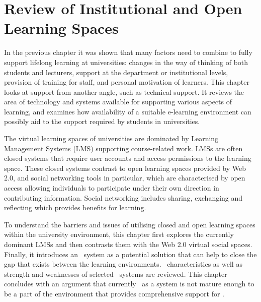 \chapter{Review of Institutional and Open Learning Spaces \label{cha:systudy}}

In the previous chapter it was shown that many factors need to combine to fully
support lifelong learning at universities: changes in the way of thinking of
both students and lecturers, support at the department or institutional levels,
provision of training for staff, and personal motivation of learners. This
chapter looks at \LLLs support from another angle, such as technical support. It
reviews the area of technology and systems available for supporting various
aspects of learning, and examines how availability of a suitable e-learning
environment can possibly aid to the \LLLs support required by students in
universities.

The virtual learning spaces of universities are dominated by Learning Management
Systems (LMS) supporting course-related work. LMSs are often closed systems that
require user accounts and access permissions to the learning space. These
closed systems contrast to open learning spaces provided by Web 2.0, and social
networking tools in particular, which are characterised by open access allowing
individuals to participate under their own direction in contributing
information. Social networking includes sharing, exchanging and reflecting which
provides benefits for learning. 
 
To understand the barriers and issues of utilising closed and open learning
spaces within the university environment, this chapter first explores the
currently dominant LMSs and then contrasts them with the Web 2.0 virtual social
spaces. Finally, it introduces an \ep~system as a potential solution that can
help to close the gap that exists between the learning environments.
\ep~characteristics as well as strength and weaknesses of selected \ep~systems
are reviewed. This chapter concludes with an argument that currently
\ep~as a system is not mature enough to be a part of the environment that
provides comprehensive support for \LLLsn.

